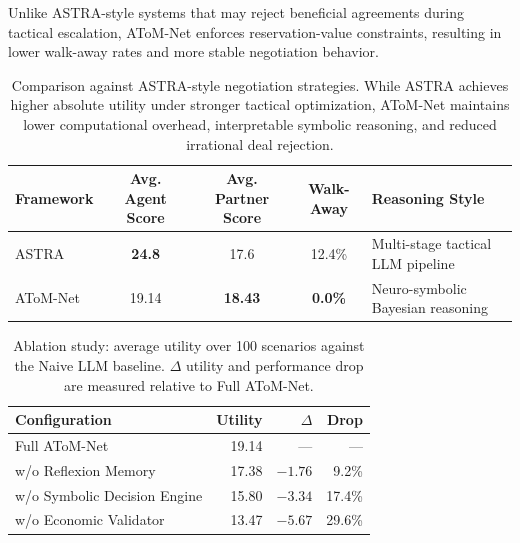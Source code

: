 \documentclass[11pt]{article}
\begin{document}
Unlike ASTRA-style systems that may reject beneficial agreements during tactical escalation, AToM-Net enforces reservation-value constraints, resulting in lower walk-away rates and more stable negotiation behavior.

\begin{table}[t]
\centering
\renewcommand{\arraystretch}{1.15}
\setlength{\tabcolsep}{6pt}

\begin{tabularx}{\textwidth}{l c c c X}
\toprule

\textbf{Framework} &
\textbf{Avg. Agent Score} &
\textbf{Avg. Partner Score} &
\textbf{Walk-Away} &
\textbf{Reasoning Style} \\

\midrule

ASTRA &
\textbf{24.8} &
17.6 &
12.4\% &
Multi-stage tactical LLM pipeline \\

AToM-Net &
19.14 &
\textbf{18.43} &
\textbf{0.0\%} &
Neuro-symbolic Bayesian reasoning \\

\bottomrule
\end{tabularx}
\caption{Comparison against ASTRA-style negotiation strategies. While ASTRA achieves higher absolute utility under stronger tactical optimization, AToM-Net maintains lower computational overhead, interpretable symbolic reasoning, and reduced irrational deal rejection.}
\label{tab:astra_comparison}

\end{table}

\begin{table}[t]
\centering
\renewcommand{\arraystretch}{1.2}

\small
\setlength{\tabcolsep}{3pt}
\begin{tabularx}{\columnwidth}{@{}>{\raggedright\arraybackslash}Xrrr@{}}
\toprule
\textbf{Configuration} & \textbf{Utility} & \textbf{$\Delta$} & \textbf{Drop} \\
\midrule
Full AToM-Net          & 19.14 & ---     & ---  \\
w/o Reflexion Memory   & 17.38 & $-1.76$ & 9.2\%  \\
w/o Symbolic Decision Engine & 15.80 & $-3.34$ & 17.4\% \\
w/o Economic Validator & 13.47 & $-5.67$ & 29.6\% \\
\bottomrule
\end{tabularx}
\caption{Ablation study: average utility over 100 scenarios against the Naive LLM baseline. $\Delta$ utility and performance drop are measured relative to Full AToM-Net.}
\label{tab:ablation}
\end{table}
\end{document}
